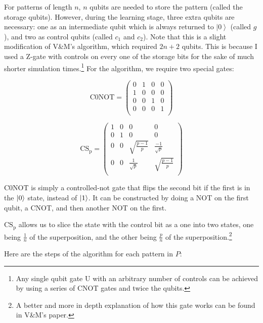 \documentclass[11pt]{report}
\newcommand{\?}{\stackrel{?}{=}}
\begin{document}
For patterns of length $n$, $n$ qubits are needed to store the pattern (called the storage qubits). However, during the learning stage, three extra qubits are necessary: one as an intermediate qubit which is always returned to $ \left | 0 \right \rangle$ (called $g$), and two as control qubits (called $c_1$ and $c_2$). Note that this is a slight modification of V\&M's algorithm, which required $2n+2$ qubits. This is because I used a Z-gate with controls on every one of the storage bits for the sake of much shorter simulation times.\footnote{Any single qubit gate U with an arbitrary number of controls can be achieved by using a series of CNOT gates and twice the qubits.} For the algorithm, we require two special gates:

$$\mathrm{C0NOT}=\begin{pmatrix}
0 & 1 & 0 & 0 \\
1 & 0 & 0 & 0 \\
0 & 0 & 1 & 0 \\
0 & 0 & 0 & 1 \\
\end{pmatrix}$$

$$\mathrm{CS_p}=\begin{pmatrix}
1 & 0 & 0 & 0 \\
0 & 1 & 0 & 0 \\
0 & 0 & \sqrt{\frac{p-1}{p}} & \frac{-1}{\sqrt{p}} \\
0 & 0 & \frac{1}{\sqrt{p}} & \sqrt{\frac{p-1}{p}} \\
\end{pmatrix}$$

C0NOT is simply a controlled-not gate that flips the second bit if the first is in the $\ket{0}$ state, instead of $\ket{1}$. It can be constructed by doing a NOT on the first qubit, a CNOT, and then another NOT on the first.

$\mathrm{CS_p}$ allows us to slice the state with the control bit as a one into two states, one being $\frac{1}{n}$ of the superposition, and the other being $\frac{p}{n}$ of the superposition.\footnote{A better and more in depth explanation of how this gate works can be found in V\&M's paper.}

Here are the steps of the algorithm for each pattern in $P$:
\end{document}
